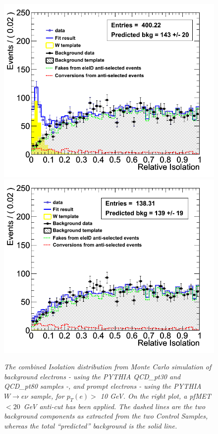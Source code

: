 
\begin{figure}[h!]
\centering
\includegraphics[scale=0.32]{Plots/w_combIso_pt10_fit_MC.png}
\includegraphics[scale=0.32]{Plots/w_combIso_pt10_METanticut_fit_MC.png}
\caption{\textit{The combined Isolation distribution from Monte Carlo simulation of background electrons - using the PYTHIA QCD\_pt30 and QCD\_pt80 samples -, and prompt electrons - using the PYTHIA $W \rightarrow e\nu$ sample, for $p_{T}(e)>$ 10 GeV. On the right plot, a pfMET $ < 20$~GeV anti-cut has been applied. The dashed lines are the two background components as extracted from the two Control Samples, whereas the total ``predicted'' background is the solid line.}}
\label{fig:w_combIso_fit}
\end{figure}

